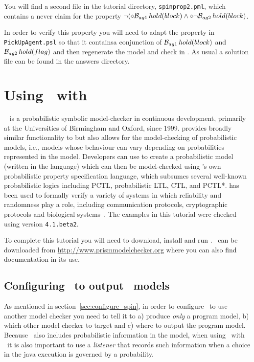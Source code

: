 \documentclass[a4]{article}
\begin{document}
You will find a second file in the tutorial directory, \texttt{spinprop2.pml}, which contains a never claim for the property $\neg (\diamond \mathrm{{\cal B}}_{ag1} \, hold(block) \wedge \diamond \neg \mathrm{{\cal B}}_{ag2} \, hold(block)$.

In order to verify this property you will need to adapt the property in \texttt{PickUpAgent.psl} so that it containsa  conjunction of $\mathrm{{\cal B}}_{ag1} \, hold(block)$ and $\mathrm{{\cal B}}_{ag2} \, hold(flag)$ and then regenerate the model and check in \spin.  As usual a solution file can be found in the answers directory.

\section{Using \ajpf\ with \prism}
\prism{}~\cite{KNP11} is a probabilistic symbolic model-checker in
continuous development, primarily at the Universities of Birmingham
and Oxford, since 1999. \prism{} provides broadly similar
functionality to \spin{} but also allows for the model-checking of
probabilistic models, i.e., models whose behaviour can vary depending
on probabilities represented in the model. Developers can use \prism{} to
create a probabilistic model (written in the \prism{} language) which
can then be model-checked using \prism{}'s own probabilistic property
specification language, which subsumes several well-known
probabilistic logics including PCTL, probabilistic LTL, CTL, and
PCTL*.  \prism{} has been used to formally verify a variety of systems
in which reliability and randomness play a role, including
communication protocols, cryptographic protocols and biological
systems~\cite{PRISM:url}. The examples in this tutorial were checked using \prism{} version
\texttt{4.1.beta2}.

To complete this tutorial you will need to download, install and run \prism.  \prism\ can be downloaded from \url{http://www.prismmodelchecker.org} where you can also find documentation in its use.

\subsection{Configuring \ajpf\ to output \prism\ models}

As mentioned in section~\ref{sec:configure_spin}, in order to configure \ajpf\ to use another model checker you need to tell it to a) produce \emph{only} a program model, b) which other model checker to target and c) where to output the program model.  Because \prism\ also includes probabilistic information in the model, when using \ajpf\ with \prism\ it is also important to use a \emph{listener} that records such information when a choice in the java execution is governed by a probability.
\end{document}
